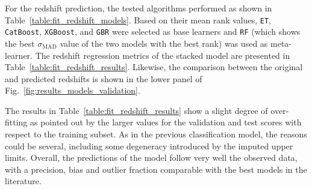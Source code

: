 \documentclass{aa}
\begin{document}
For the redshift prediction, the tested algorithms performed as shown in Table~\ref{table:fit_redshift_models}. 
Based on their mean rank values, \verb|ET|, \verb|CatBoost|, \verb|XGBoost|, and \verb|GBR| were selected as base learners and \verb|RF| (which shows the best $\sigma_{\mathrm{MAD}}$ value of the two models with the best rank) was used as meta-learner.
The redshift regression metrics of the stacked model are presented in Table~\ref{table:fit_redshift_results}. 
Likewise, the comparison between the original and predicted redshifts is shown in the lower panel of Fig.~\ref{fig:results_models_validation}.

\begin{table}
\setlength{\tabcolsep}{3pt}
\caption{Redshift prediction metrics for the training, test, and validation subsets for HETDEX \& Stripe 82 as discussed in Sect.~\ref{sec:results_prediction_pipeline}.}             %
\label{table:fit_redshift_results}      %
\centering                          %
\end{table}

The results in Table~\ref{table:fit_redshift_results} show a slight degree of over-fitting as pointed out by the larger values for the validation and test scores with respect to the training subset. As in the previous classification model, the reasons could be several, including some degeneracy introduced by the imputed upper limits. Overall, the predictions of the model follow very well the observed data, with a precision, bias and outlier fraction comparable with the best models in the literature.
\end{document}
